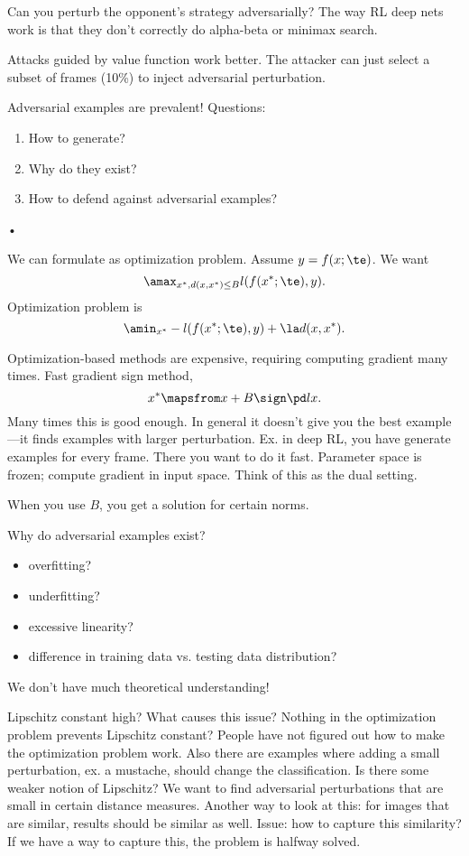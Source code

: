 
Can you perturb the opponent's strategy adversarially?
The way RL deep nets work is that they don't correctly do alpha-beta or minimax search. 

Attacks guided by value function work better. The attacker can just select a subset of frames  (10\%) to inject adversarial perturbation.

Adversarial examples are prevalent! Questions:
\begin{enumerate}
\item
How to generate?
\item
Why do they exist?
\item
How to defend against adversarial examples?
\end{enumerate}•

We can formulate as optimization problem. Assume $y=f(x;\te)$. We want
$$
\amax_{x^*, d(x,x^*)\le B} l(f(x^*;\te),y).
$$
Optimization problem is
$$
\amin_{x^*} -l(f(x^*;\te), y) + \la d(x,x^*).
$$

Optimization-based methods are expensive, requiring computing gradient many times. 
Fast gradient sign method, 
$$
x^*\mapsfrom x+ B\sign\pd lx.
$$
Many times this is good enough.
In general it doesn't give you the best example---it finds examples with larger perturbation.
Ex. in deep RL, you have generate examples for every frame. There you want to do it fast.
Parameter space is frozen; compute gradient in input space. Think of this as the dual setting.

When you use $B$, you get a solution for certain norms.

Why do adversarial examples exist? 
\begin{itemize}
\item
overfitting?
\item
underfitting?
\item
excessive linearity?
\item
difference in training data vs. testing data distribution?
\end{itemize}

We don't have much theoretical understanding!


Lipschitz constant high? What causes this issue? Nothing in the optimization problem prevents Lipschitz constant? People have not figured out how to make the optimization problem work. Also there are examples where adding a small perturbation, ex. a mustache, should change the classification. Is there some weaker notion of Lipschitz? 
We want to find adversarial perturbations that are small in certain distance measures. Another way to look at this: for images that are similar, results should be similar as well. Issue: how to capture this similarity? 
If we have a way to capture this, the problem is halfway solved. 

